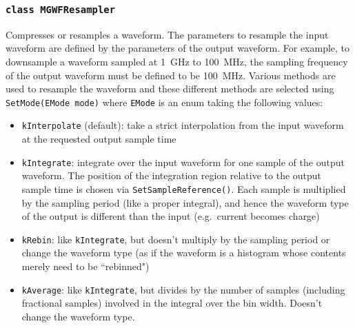 			\subsubsection{\lstinline!class MGWFResampler!}
Compresses or resamples a waveform.  The parameters to resample the input waveform are defined by the parameters of the output waveform.  For example, to downsample a waveform sampled at 1~GHz to 100~MHz, the sampling frequency of the output waveform must be defined to be 100~MHz.  Various methods are used to resample the waveform and these different methods are selected using \lstinline!SetMode(EMode mode)! where \lstinline!EMode! is an enum taking the following values:
				\begin{itemize}
					\item \lstinline!kInterpolate! (default): take a strict interpolation from the input
					 waveform at the requested output sample time
					\item \lstinline!kIntegrate!: integrate over the input waveform for one sample of the
					 output waveform. The position of the integration region relative to
					 the output sample time is chosen via \lstinline!SetSampleReference()!. Each
					 sample is multiplied by the sampling period (like a proper
					 integral), and hence the waveform type of the output is different
					 than the input (e.g.~current becomes charge)
					\item \lstinline!kRebin!: like \lstinline!kIntegrate!, but doesn't multiply by the sampling period
					 or change the waveform type (as if the waveform is a histogram whose
					 contents merely need to be ``rebinned")
					\item \lstinline!kAverage!: like \lstinline!kIntegrate!, but divides by the number of samples
					 (including fractional samples) involved in the integral over the bin
					 width. Doesn't change the waveform type.

				\end{itemize}				  
			
